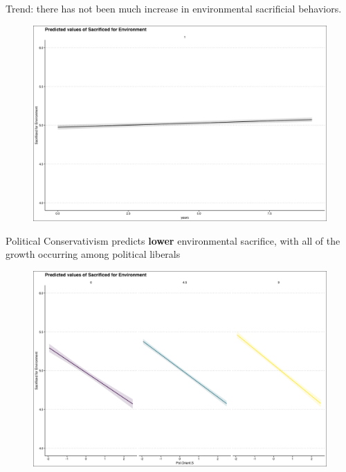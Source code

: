 \documentclass{beamer}
\begin{document}
\begin{frame}{Trend: there has not been much increase in environmental sacrificial behaviors.}
\begin{figure}
\includegraphics[width=.8\textwidth,height=\textheight,keepaspectratio]{Figures/SACRIFICEMADE_TIME.png}
\end{figure}
% 
% 
% 

\begin{frame}{Political Conservativism predicts {\bf lower} environmental sacrifice, with all of the growth occurring among political liberals}
\begin{figure}
\includegraphics[width=.8\textwidth,height=\textheight,keepaspectratio]{Figures/SACRIFICEMADE_Pol.Orient.S.png}
\end{figure}
\end{frame}



\end{frame}
\end{document}
